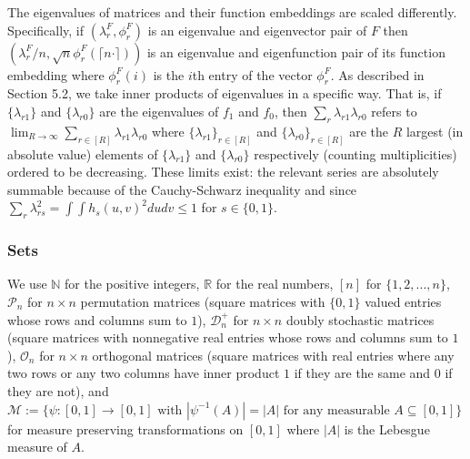 \documentclass[12pt]{article}
\theoremstyle{definition}
\begin{document}
The eigenvalues of matrices and their function embeddings are scaled differently. Specifically, if $(\lambda^{F}_{r},\phi^{F}_{r})$ is an eigenvalue and eigenvector pair of $F$ then $(\lambda^{F}_{r}/n,\sqrt{n}\phi^{F}_{r}(\lceil n\cdot\rceil))$ is an eigenvalue and eigenfunction pair of its function embedding where $\phi^{F}_{r}(i)$ is the $i$th entry of the vector $\phi^{F}_{r}$. As described in Section 5.2, we take inner products of eigenvalues in a specific way. That is, if $\{\lambda_{r1}\}$ and $\{\lambda_{r0}\}$ are the eigenvalues of $f_{1}$ and $f_{0}$, then $\sum_{r}\lambda_{r1}\lambda_{r0}$ refers to $\lim_{R \to \infty}\sum_{r \in [R]}\lambda_{r1}\lambda_{r0}$ where $\{\lambda_{r1}\}_{r \in [R]}$ and $\{\lambda_{r0}\}_{r \in [R]}$ are the $R$ largest (in absolute value) elements of $\{\lambda_{r1}\}$ and $\{\lambda_{r0}\}$ respectively (counting multiplicities) ordered to be decreasing.  These limits exist: the relevant series are absolutely summable because of the Cauchy-Schwarz inequality and since $\sum_{r}\lambda_{rs}^2 = \int\int h_s(u,v)^2dudv \leq 1$ for $s \in \{0,1\}$.

\subsubsection{Sets}
We use $\mathbb{N}$ for the positive integers, $\mathbb{R}$ for the real numbers, $[n]$ for $\{1,2,...,n\}$, $\mathcal{P}_{n}$ for $n\times n$ permutation matrices (square matrices with $\{0,1\}$ valued entries whose rows and columns sum to $1$), $\mathcal{D}_{n}^{+}$ for $n\times n$ doubly stochastic matrices (square matrices with nonnegative real entries whose rows and columns sum to $1$), $\mathcal{O}_{n}$ for $n\times n$ orthogonal matrices (square matrices with real entries where any two rows or any two columns have inner product $1$ if they are the same and $0$ if they are not), and $\mathcal{M} := \{\psi: [0,1] \to [0,1]\text{ with } |\psi^{-1}(A)| = |A| \text{ for any measurable } A \subseteq [0,1]\}$ for measure preserving transformations on $[0,1]$ where $|A|$ is the Lebesgue measure of $A$.  
\end{document}
